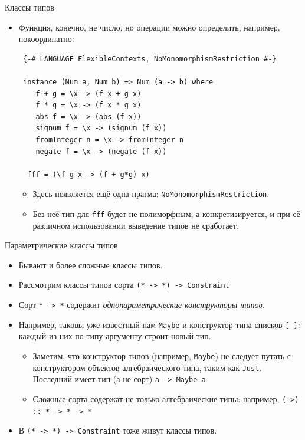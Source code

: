 \documentclass[xcolor=dvipsnames]{beamer}
\begin{document}
\begin{frame}[fragile]{Классы типов}
 \begin{itemize}[<+->]
  \item Функция, конечно, не число, но операции можно определить, например, покоординатно:
  {\scriptsize
\begin{verbatim}
 {-# LANGUAGE FlexibleContexts, NoMonomorphismRestriction #-}
 
 instance (Num a, Num b) => Num (a -> b) where
    f + g = \x -> (f x + g x)
    f * g = \x -> (f x * g x)
    abs f = \x -> (abs (f x))
    signum f = \x -> (signum (f x))
    fromInteger n = \x -> fromInteger n
    negate f = \x -> (negate (f x))

  fff = (\f g x -> (f + g*g) x)
\end{verbatim}
  }
  \begin{itemize}
  \item Здесь появляется ещё одна прагма: \texttt{NoMonomorphismRestriction}. 
  \item Без неё тип для \texttt{fff} будет не полиморфным, а конкретизируется, и при её различном 
  использовании выведение типов не сработает. 
  \end{itemize}
 \end{itemize}

\end{frame}


\begin{frame}[fragile]{Параметрические классы типов}
 
 \begin{itemize}[<+->]
  \item Бывают и более сложные классы типов. 
  \item Рассмотрим классы типов сорта \texttt{(* -> *) -> Constraint}
  \item Сорт \texttt{* -> *} содержит {\em однопараметрические конструкторы типов.} 
  \item Например, таковы уже известный нам \texttt{Maybe} и конструктор типа списков \texttt{[ ]}: каждый из них по типу-аргументу строит новый тип.
  \begin{itemize}
  \item Заметим, что конструктор типов (например, \texttt{Maybe}) не следует путать с конструктором объектов алгебраического типа, таким как \texttt{Just}. Последний имеет тип (а не сорт) \texttt{a}\texttt{ -> Maybe a}
  \item Сложные сорта содержат не только алгебраические типы: например, \texttt{(->) :: * -> * -> *}
  \end{itemize}
  \item В \texttt{(* -> *) -> Constraint}  тоже живут классы типов.
 \end{itemize}

\end{frame}
\end{document}

